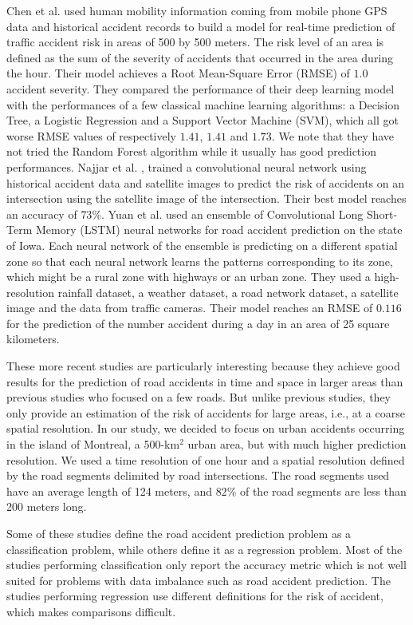 \documentclass[conference]{IEEEtran}
\begin{document}
Chen et al. \cite{QChen2016} used human mobility information coming from
mobile phone GPS data and historical accident records to build a model for
real-time prediction of traffic accident risk in areas of 500 by 500
meters. The risk level of an area is defined as the sum of the severity of
accidents that occurred in the area during the hour. Their model achieves
a Root Mean-Square Error (RMSE) of $1.0$ accident severity. They compared the performance of their deep learning
model with the performances of a few classical machine learning
algorithms: a Decision Tree, a Logistic Regression and a Support Vector
Machine (SVM), which all got worse RMSE values of respectively $1.41$,
$1.41$ and $1.73$. We note that they have not tried the Random
Forest algorithm while it usually has good prediction performances. Najjar et
al. \cite{Najjar2017}, trained a convolutional neural network using
historical accident data and satellite images to predict the risk of
accidents on an intersection using the satellite image of the intersection.
Their best model reaches an accuracy of $73\%$. Yuan et al. \cite{Yuan2018}
used an ensemble of Convolutional Long Short-Term Memory (LSTM) neural
networks for road accident prediction on the state of Iowa. Each neural
network of the ensemble is predicting on a different spatial zone so that
each neural network learns the patterns corresponding to its zone, which
might be a rural zone with highways or an urban zone. They used a
high-resolution rainfall dataset, a weather dataset, a road network
dataset, a satellite image and the data from traffic cameras. Their model
reaches an RMSE of $0.116$ for the prediction of the number accident during
a day in an area of 25 square kilometers.

These more recent studies are particularly interesting because they achieve
good results for the prediction of road accidents in time and space in
larger areas than previous studies who focused on a few roads. But unlike
previous studies, they only provide an estimation of the risk of accidents
for large areas, i.e., at a coarse spatial resolution.
In our study, we decided to focus on urban accidents
occurring in the island of Montreal, a 500-km$^2$ urban area, but with much higher
prediction resolution. We used a time resolution of one hour and a spatial
resolution defined by the road segments delimited by road intersections. The road
segments used have an average length of 124 meters, and $82\%$ of the road
segments are less than 200 meters long.

Some of these studies define the road accident prediction problem as a 
classification problem, while others define it as a regression problem.
Most of the studies performing classification only report the accuracy
metric which is not well suited for problems with data imbalance such as
road accident prediction\cite{He2009}. The studies performing regression
use different definitions for the risk of accident, which makes comparisons
difficult.
\end{document}
